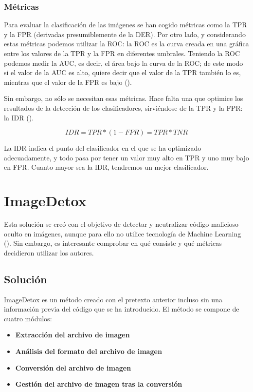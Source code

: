 \subsubsection{Métricas}

Para evaluar la clasificación de las imágenes se han cogido métricas como la \ac{TPR} y la \ac{FPR} (derivadas presumiblemente de la \ac{DER}). Por otro lado, y considerando estas métricas podemos utilizar la \ac{ROC}: la \ac{ROC} es la curva creada en una gráfica entre los valores de la \ac{TPR} y la \ac{FPR} en diferentes umbrales. Teniendo la \ac{ROC} podemos medir la \ac{AUC}, es decir, el área bajo la curva de la \ac{ROC}; de este modo si el valor de la \ac{AUC} es alto, quiere decir que el valor de la \ac{TPR} también lo es, mientras que el valor de la \ac{FPR} es bajo (\cite{auc}). %

Sin embargo, no sólo se necesitan esas métricas. Hace falta una que optimice los resultados de la detección de los clasificadores, sirviéndose de la \ac{TPR} y la \ac{FPR}: la \ac{IDR} (\cite{idr}). %

\begin{equation}
IDR = TPR*(1 - FPR) = TPR*TNR
\end{equation}

La \ac{IDR} indica el punto del clasificador en el que se ha optimizado adecuadamente, y todo pasa por tener un valor muy alto en \ac{TPR} y uno muy bajo en \ac{FPR}. Cuanto mayor sea la \ac{IDR}, tendremos un mejor clasificador.

\section{ImageDetox}

Esta solución se creó con el objetivo de detectar y neutralizar código malicioso oculto en imágenes, aunque para ello no utilice tecnología de Machine Learning (\cite{imagedetox}). Sin embargo, es interesante comprobar en qué consiste y qué métricas decidieron utilizar los autores. %

\subsection{Solución}

ImageDetox es un método creado con el pretexto anterior incluso sin una información previa del código que se ha introducido. El método se compone de cuatro módulos:

\begin{itemize}
\item \textbf{Extracción del archivo de imagen}
\item \textbf{Análisis del formato del archivo de imagen}
\item \textbf{Conversión del archivo de imagen}
\item \textbf{Gestión del archivo de imagen tras la conversión}
\end{itemize}

